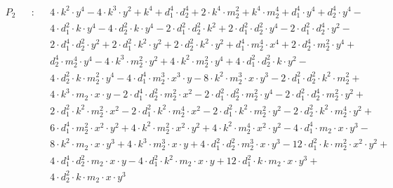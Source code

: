 \begin{equation}\label{eq:a}
  \begin{split}
  & P_2 && : && 4 \cdot k^2 \cdot y^4
    - 4 \cdot k^3 \cdot y^2
    + k^4 + d_1^4 \cdot d_2^4
    + 2 \cdot k^4 \cdot m_2^2
    + k^4 \cdot m_2^4
    + d_1^4 \cdot y^4
    + d_2^4 \cdot y^4 -\\
  & && && 4 \cdot d_1^2 \cdot k \cdot y^4
    - 4 \cdot d_2^2 \cdot k \cdot y^4
    - 2 \cdot d_1^2 \cdot d_2^2 \cdot k^2
    + 2 \cdot d_1^2 \cdot d_2^2 \cdot y^4
    - 2 \cdot d_1^2 \cdot d_2^4 \cdot y^2 -\\
  & && && 2 \cdot d_1^4 \cdot d_2^2 \cdot y^2
    + 2 \cdot d_1^2 \cdot k^2 \cdot y^2
    + 2 \cdot d_2^2 \cdot k^2 \cdot y^2
    + d_1^4 \cdot m_2^4 \cdot x^4
    + 2 \cdot d_2^4 \cdot m_2^2 \cdot y^4 +\\
  & && && d_2^4 \cdot m_2^4 \cdot y^4
    - 4 \cdot k^3 \cdot m_2^2 \cdot y^2
    + 4 \cdot k^2 \cdot m_2^2 \cdot y^4
    + 4 \cdot d_1^2 \cdot d_2^2 \cdot k \cdot y^2 - \\
  & && && 4 \cdot d_2^2 \cdot k \cdot m_2^2 \cdot y^4
    - 4 \cdot d_1^4 \cdot m_2^3 \cdot x^3 \cdot y
    - 8 \cdot k^2 \cdot m_2^3 \cdot x \cdot y^3
    - 2 \cdot d_1^2 \cdot d_2^2 \cdot k^2 \cdot m_2^2 +\\
  & && && 4 \cdot k^3 \cdot m_2 \cdot x \cdot y
    - 2 \cdot d_1^4 \cdot d_2^2 \cdot m_2^2 \cdot x^2
    - 2 \cdot d_1^2 \cdot d_2^2 \cdot m_2^2 \cdot y^4
    - 2 \cdot d_1^2 \cdot d_2^4 \cdot m_2^2 \cdot y^2+\\
  & && && 2 \cdot d_1^2 \cdot k^2 \cdot m_2^2 \cdot x^2
    - 2 \cdot d_1^2 \cdot k^2 \cdot m_2^4 \cdot x^2
    - 2 \cdot d_1^2 \cdot k^2 \cdot m_2^2 \cdot y^2
    - 2 \cdot d_2^2 \cdot k^2 \cdot m_2^4 \cdot y^2 +\\
  & && && 6 \cdot d_1^4 \cdot m_2^2 \cdot x^2 \cdot y^2
    + 4 \cdot k^2 \cdot m_2^2 \cdot x^2 \cdot y^2
    + 4 \cdot k^2 \cdot m_2^4 \cdot x^2 \cdot y^2
    - 4 \cdot d_1^4 \cdot m_2 \cdot x \cdot y^3 -\\
  & && && 8 \cdot k^2 \cdot m_2 \cdot x \cdot y^3
    + 4 \cdot k^3 \cdot m_2^3 \cdot x \cdot y
    + 4 \cdot d_1^2 \cdot d_2^2 \cdot m_2^3 \cdot x \cdot y^3
    - 12 \cdot d_1^2 \cdot k \cdot m_2^2 \cdot x^2 \cdot y^2 +\\
  & && && 4 \cdot d_1^4 \cdot d_2^2 \cdot m_2 \cdot x \cdot y
    - 4 \cdot d_1^2 \cdot k^2 \cdot m_2 \cdot x \cdot y
    + 12 \cdot d_1^2 \cdot k \cdot m_2 \cdot x \cdot y^3 +\\
  & && && 4 \cdot d_2^2 \cdot k \cdot m_2 \cdot x \cdot y^3

\end{split}
\end{equation}
